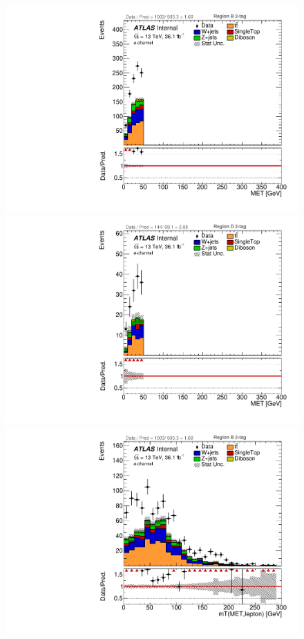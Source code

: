\begin{figure}[!htbp]
\begin{center}
\includegraphics[scale=0.33]{./figures/boosted/ABCD_ScaledPrompt/elec_Inc_RegionB_MET}    
\includegraphics[scale=0.33]{./figures/boosted/ABCD_ScaledPrompt/elec_Inc_RegionD_MET}   \\
\includegraphics[scale=0.33]{./figures/boosted/ABCD_ScaledPrompt/elec_Inc_RegionB_WlepMtATLAS}

\end{center}
\end{figure}
